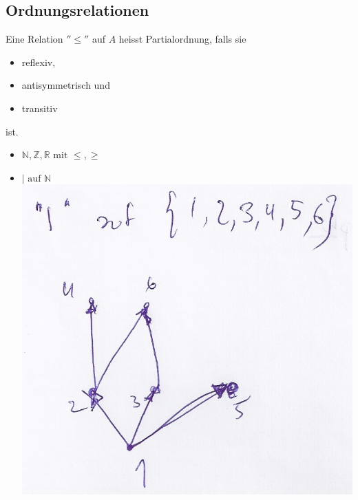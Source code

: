 \subsection{Ordnungsrelationen}
\begin{def*}[note = Partialordnung , index = Partialordnung]
	Eine Relation $''\leq''$ auf $A$ heisst Partialordnung, falls sie
	\begin{itemize}
		\item reflexiv,
		\item antisymmetrisch und
		\item transitiv
	\end{itemize}
	ist.
\end{def*}
\begin{bsp*}
	\begin{itemize}
		\item $\mathbb{N}, \mathbb{Z}, \mathbb{R} \text{ mit } \leq, \geq$
		\item $| \text{ auf } \mathbb{N}$ \\
			\includegraphics{Bild19} \\

\end{itemize}
\end{bsp*}
